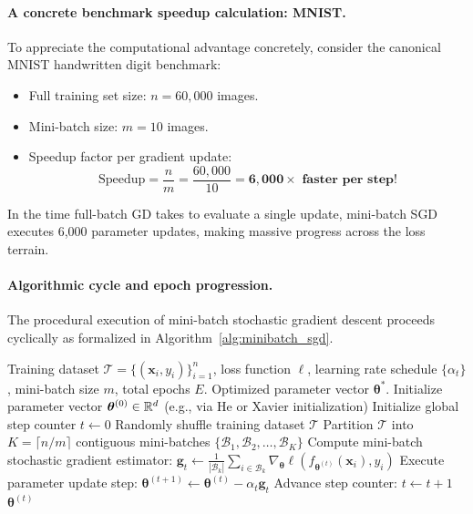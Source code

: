 \paragraph{A concrete benchmark speedup calculation: MNIST.}
To appreciate the computational advantage concretely, consider the canonical MNIST handwritten digit benchmark:
\begin{itemize}[noitemsep]
  \item Full training set size: $n = 60{,}000$ images.
  \item Mini-batch size: $m = 10$ images.
  \item Speedup factor per gradient update:
  \begin{equation}
  \text{Speedup} = \frac{n}{m} = \frac{60{,}000}{10} = \mathbf{6{,}000 \times \text{ faster per step!}}
  \end{equation}
\end{itemize}
In the time full-batch GD takes to evaluate a single update, mini-batch SGD executes 6,000 parameter updates, making massive progress across the loss terrain.

\paragraph{Algorithmic cycle and epoch progression.}
The procedural execution of mini-batch stochastic gradient descent proceeds cyclically as formalized in Algorithm~\ref{alg:minibatch_sgd}.

\begin{algorithm}[H]
\caption{Mini-Batch Stochastic Gradient Descent (SGD)}
\label{alg:minibatch_sgd}
\begin{algorithmic}[1]
\Require Training dataset $\mathcal{T} = \{(\mathbf{x}_i, y_i)\}_{i=1}^n$, loss function $\ell$, learning rate schedule $\{\alpha_t\}$, mini-batch size $m$, total epochs $E$.
\Ensure Optimized parameter vector $\boldsymbol{\theta}^*$.
\State Initialize parameter vector $\boldsymbol{\theta}^{(0)} \in \mathbb{R}^d$ (e.g., via He or Xavier initialization)
\State Initialize global step counter $t \gets 0$
    \State Randomly shuffle training dataset $\mathcal{T}$
    \State Partition $\mathcal{T}$ into $K = \lceil n / m \rceil$ contiguous mini-batches $\{\mathcal{B}_1, \mathcal{B}_2, \dots, \mathcal{B}_K\}$
        \State Compute mini-batch stochastic gradient estimator:
        \Statex \qquad\qquad $\mathbf{g}_t \gets \frac{1}{|\mathcal{B}_k|} \sum_{i \in \mathcal{B}_k} \nabla_{\boldsymbol{\theta}} \ell(f_{\boldsymbol{\theta}^{(t)}}(\mathbf{x}_i), y_i)$
        \State Execute parameter update step:
        \Statex \qquad\qquad $\boldsymbol{\theta}^{(t+1)} \gets \boldsymbol{\theta}^{(t)} - \alpha_t \mathbf{g}_t$
        \State Advance step counter: $t \gets t + 1$
    \EndFor
\EndFor
\State \Return $\boldsymbol{\theta}^{(t)}$
\end{algorithmic}
\end{algorithm}


